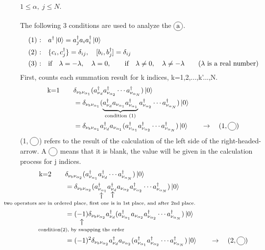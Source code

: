 \documentclass{article}
\makeatletter
\newcommand\vertarrowbox[2]{%
    \begin{array}[t]{@{}c@{}} #1 \\
    \rotatebox{90}{$\xrightarrow{\hphantom{a}}$} \\[-1ex]
    \mathclap{\scriptstyle\text{#2}}%
    \end{array}}
\newcommand\encircle[1]{%
    \tikz[baseline=(X.base)] 
      \node (X) [draw, shape=circle, inner sep=0] {\strut #1};}
\makeatother
\begin{document}
 $1\leq \alpha,\; j \leq N$. \\
 \\
The following 3 conditions are used to analyze the $\encircle{a}$.
\begin{align*}
    & \text{(1) :} \quad a^{\dagger}\ket{0} = a^{\dagger}_j a_i a^{\dagger}_i \ket{0}\\
    & \text{(2) :} \quad \{ c_i , c^{\dagger}_j \} = \delta_{ij}, \quad [b_i , b^{\dagger}_j] = \delta_{ij}\\ 
    & \text{(3) :} \quad \text{if} \quad \lambda=-\lambda, \quad \lambda=0 , \qquad \text{if} \quad \lambda \neq 0, \quad \lambda \neq- \lambda
    \qquad (\text{$\lambda$ is a real number})
\end{align*}
First, counts each summation result for k indices, k=1,2,...,k'...,N.
\begin{align*}
    \text{k=1} \qquad &\delta_{\nu_b \nu_{\alpha_1}} (a^{\dagger}_{\nu_d} a^{\dagger}_{\nu_{\alpha_2}} \cdots a^{\dagger}_{\nu_{\alpha_N}})\ket{0}\\
    & =\delta_{\nu_b \nu_{\alpha_1}} (\underbrace{a^{\dagger}_{\nu_d} a_{\nu_{\alpha_1}} a^{\dagger}_{\nu_{\alpha_1}}}_{\text{condition (1)}}a^{\dagger}_{\nu_{\alpha_2}} \cdots a^{\dagger}_{\nu_{\alpha_N}})\ket{0}\\
    & =\delta_{\nu_b \nu_{\alpha_1}} a^{\dagger}_{\nu_d} a_{\nu_{\alpha_1}} (a^{\dagger}_{\nu_{\alpha_1}}a^{\dagger}_{\nu_{\alpha_2}} \cdots a^{\dagger}_{\nu_{\alpha_N}})\ket{0} \qquad \rightarrow \quad (1,\encircle{})
\end{align*}
(1,$\;\encircle{}$) refers to the result of the calculation of the left side of the right-headed-arrow. 
A $\encircle{}$ means that it is blank, the value will be given in the calculation process for j indices.
\begin{align*}
    \text{k=2} \qquad &\delta_{\nu_b \nu_{\alpha_2}} (a^{\dagger}_{\nu_{\alpha_1}} a^{\dagger}_{\nu_d} \cdots a^{\dagger}_{\nu_{\alpha_N}})\ket{0}\\
    & =\delta_{\nu_b \nu_{\alpha_2}} (\vertarrowbox{a^{\dagger}_{\nu_{\alpha_1}}}{\text{two operators are in ordered place, first one is in 1st place, and after 2nd place. }} \vertarrowbox{a^{\dagger}_{\nu_d}}{} a_{\nu_{\alpha_2}} a^{\dagger}_{\nu_{\alpha_2}} \cdots a^{\dagger}_{\nu_{\alpha_N}})\ket{0}\\
    & =\vertarrowbox{(-1)}{\text{condition(2), by swapping the order}} \delta_{\nu_b \nu_{\alpha_2}} a^{\dagger}_{\nu_d} (a^{\dagger}_{\nu_{\alpha_1}} a_{\nu_{\alpha_2}} a^{\dagger}_{\nu_{\alpha_2}} \cdots a^{\dagger}_{\nu_{\alpha_N}})\ket{0}\\
    & =(-1)^2 \delta_{\nu_b \nu_{\alpha_2}} a^{\dagger}_{\nu_d} a_{\nu_{\alpha_2}} (a^{\dagger}_{\nu_{\alpha_1}}  a^{\dagger}_{\nu_{\alpha_2}} \cdots a^{\dagger}_{\nu_{\alpha_N}})\ket{0} \qquad \rightarrow \quad (2,\encircle{})
\end{align*}
\end{document}
